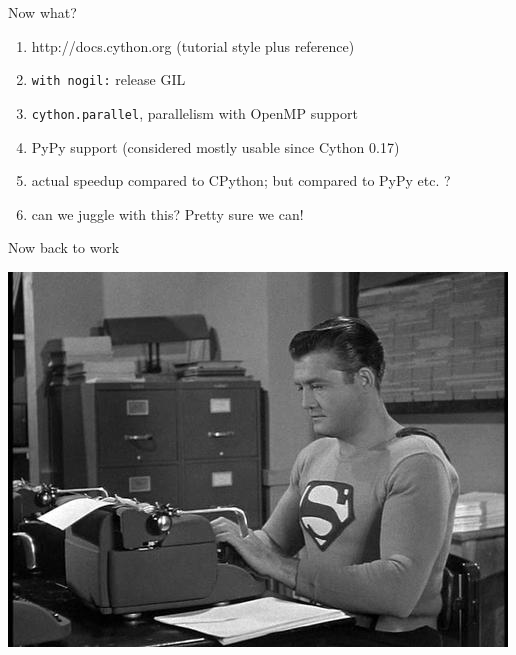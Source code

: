 \documentclass[dvipsnames]{beamer}
\begin{document}
\begin{frame}{Now what?}
\begin{enumerate}
\item http://docs.cython.org (tutorial style plus reference)
\pause\item \lstinline{with nogil:} release GIL
\item \lstinline{cython.parallel}, parallelism with OpenMP support
\item PyPy support (considered mostly usable since Cython 0.17)
\pause\item actual speedup compared to CPython; but compared to PyPy etc. ?
\item can we juggle with this? Pretty sure we can!
\end{enumerate}
\end{frame}

\begin{frame}{Now back to work}

\begin{center}\includegraphics[scale=0.7]{superman-coding.jpg}\end{center}

\end{frame}
\end{document}

